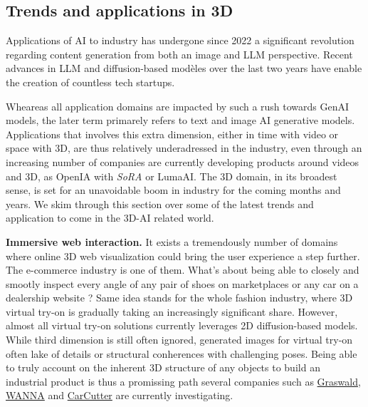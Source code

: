 \subsection{Trends and applications in 3D}
Applications of \ac{AI} to industry has undergone since 2022 a significant revolution regarding content generation from both an image and \ac{LLM} perspective. Recent advances in \ac{LLM} and diffusion-based modèles over the last two years have enable the creation of countless tech startups. 

Wheareas all application domains are impacted by such a rush towards \ac{GenAI} models, the later term primarely refers to text and image \ac{AI} generative models. Applications that involves this extra dimension, either in time with video or space with 3D, are thus relatively underadressed in the industry, even through an increasing number of companies are currently developing products around videos and 3D, as OpenIA with \textit{SoRA} or LumaAI. The 3D domain, in its broadest sense, is set for an unavoidable boom in industry for the coming months and years. We skim through this section over some of the latest trends and application to come in the 3D-\ac{AI} related world. 


\noindent \textbf{Immersive web interaction.} It exists a tremendously number of domains where online 3D web visualization could bring the user experience a step further. The e-commerce industry is one of them. What's about being able to closely and smootly inspect every angle of any pair of shoes on  marketplaces or any car on a dealership website ? Same idea stands for the whole fashion industry, where 3D virtual try-on is gradually taking an increasingly significant share. However, almost all virtual try-on solutions currently leverages 2D diffusion-based models. While third dimension is still often ignored, generated images for virtual try-on often lake of details or structural conherences with challenging poses. Being able to truly account on the inherent 3D structure of any objects to build an industrial product is thus a promissing path several companies such as \href{https://www.graswald.ai/}{Graswald}, \href{https://wanna.fashion/}{WANNA} and \href{https://www.car-cutter.com/}{CarCutter} are currently investigating. 

